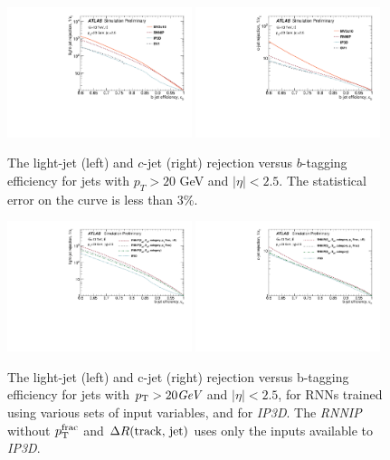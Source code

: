 \begin{figure}[htbp]
  \centering
 \includegraphics[width=0.48\textwidth]{figures/RNN/BL_ROC.pdf}
 \includegraphics[width=0.48\textwidth]{figures/RNN//BC_ROC.pdf}
\caption{The light-jet (left) and $c$-jet (right) rejection versus $b$-tagging efficiency for jets with $p_T > 20$ GeV and $|\eta|<2.5$. The statistical error on the curve is less than 3\%.}
  \label{fig:ROC}
\end{figure}

\begin{figure}[htbp]
  \centering
 \includegraphics[width=0.48\textwidth]{figures/RNN/BL_ROC_RNNComp.pdf}
 \includegraphics[width=0.48\textwidth]{figures/RNN//BC_ROC_RNNComp.pdf}
 \caption{The light-jet (left) and c-jet (right) rejection versus b-tagging efficiency for jets with $p_{{\rm T}} > 20 \textit{GeV}$ and $|\eta|<2.5$, for RNNs trained using various sets of input variables, and for \textit{IP3D}. The \textit{RNNIP} without $p_{\rm T}^{\rm frac}$ and $\Delta R(\text{track, jet})$ uses only the inputs available to \textit{IP3D}.}
  \label{fig:IP3D-RNN}
\end{figure}


